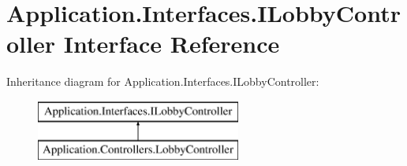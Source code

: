 \hypertarget{interface_application_1_1_interfaces_1_1_i_lobby_controller}{}\section{Application.\+Interfaces.\+I\+Lobby\+Controller Interface Reference}
\label{interface_application_1_1_interfaces_1_1_i_lobby_controller}
Inheritance diagram for Application.\+Interfaces.\+I\+Lobby\+Controller\+:\begin{figure}[H]
\begin{center}
\leavevmode
\includegraphics[height=2.000000cm]{interface_application_1_1_interfaces_1_1_i_lobby_controller}
\end{center}
\end{figure}
